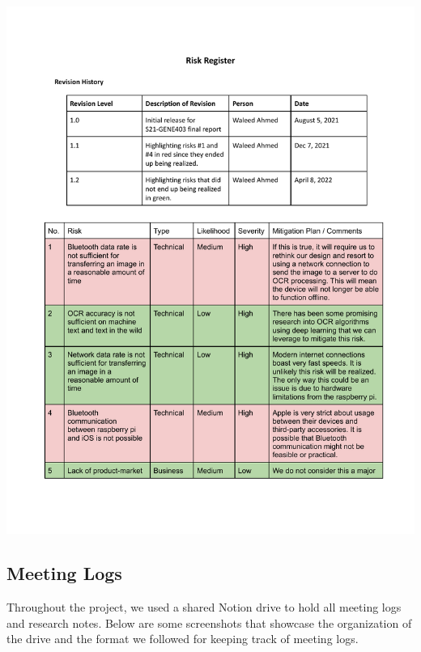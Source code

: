 \documentclass[a4paper,11pt]{article}
\begin{document}
\begin{center}
    \includegraphics[page=2,width={1.0\linewidth}]{pdf/risk_register.pdf}
\end{center}

\newpage
\subsection{Meeting Logs}
\label{meeting-logs}
Throughout the project, we used a shared Notion drive to hold all meeting logs and research notes.
Below are some screenshots that showcase the organization of the drive and the format we followed for keeping track of meeting logs.
\end{document}
